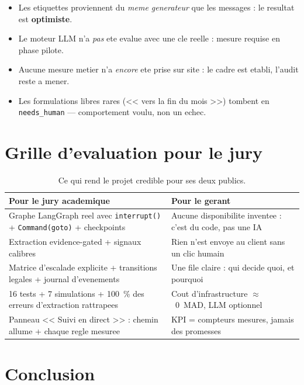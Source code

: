 \documentclass[12pt,a4paper,openany]{report}
\begin{document}
\begin{alertbox}
\begin{itemize}
\item Les etiquettes proviennent du \emph{meme generateur} que les messages : le resultat est \textbf{optimiste}.
\item Le moteur LLM n'a \emph{pas} ete evalue avec une cle reelle : mesure requise en phase pilote.
\item Aucune mesure metier n'a \emph{encore} ete prise sur site : le cadre est etabli, l'audit reste a mener.
\item Les formulations libres rares (<< vers la fin du mois >>) tombent en \texttt{needs\_human} --- comportement voulu, non un echec.
\end{itemize}
\end{alertbox}

\section{Grille d'evaluation pour le jury}

\begin{table}[H]\centering\small
\caption{Ce qui rend le projet credible pour ses deux publics.}
\label{tab:credibilite}
\begin{tabularx}{\textwidth}{X X}\toprule
\rowcolor{emsiGreen!30}\textbf{Pour le jury academique} & \textbf{Pour le gerant}\\\midrule
Graphe LangGraph reel avec \texttt{interrupt()} + \texttt{Command(goto)} + checkpoints & Aucune disponibilite inventee : c'est du code, pas une IA\\
Extraction evidence-gated + signaux calibres & Rien n'est envoye au client sans un clic humain\\
Matrice d'escalade explicite + transitions legales + journal d'evenements & Une file claire : qui decide quoi, et pourquoi\\
16 tests + 7 simulations + 100~\% des erreurs d'extraction rattrapees & Cout d'infrastructure $\approx$~0~MAD, LLM optionnel\\
Panneau << Suivi en direct >> : chemin allume + chaque regle mesuree & KPI = compteurs mesures, jamais des promesses\\
\bottomrule
\end{tabularx}
\end{table}

\section{Conclusion}
\end{document}
